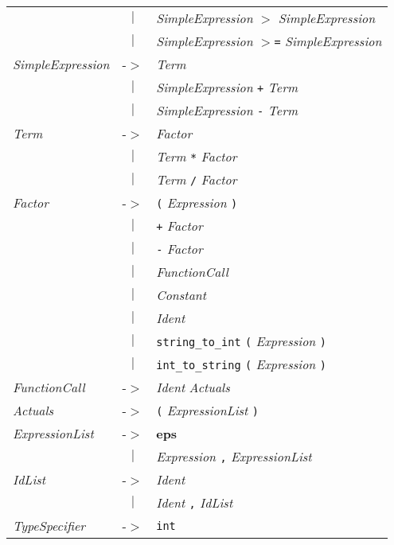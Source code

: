 \documentclass{article}
\begin{document}
\begin{center}
\begin{tabular}{lll}
 & \multicolumn{1}{c}{\textbf{$|$}} & \textit{SimpleExpression} \texttt{$>$} \textit{SimpleExpression} \\
 & \multicolumn{1}{c}{\textbf{$|$}} & \textit{SimpleExpression} \texttt{$>$=} \textit{SimpleExpression} \\
\textit{SimpleExpression} & -$>$ & \textit{Term} \\
 & \multicolumn{1}{c}{\textbf{$|$}} & \textit{SimpleExpression} \texttt{+} \textit{Term} \\
 & \multicolumn{1}{c}{\textbf{$|$}} & \textit{SimpleExpression} \texttt{-} \textit{Term} \\
\textit{Term} & -$>$ & \textit{Factor} \\
 & \multicolumn{1}{c}{\textbf{$|$}} & \textit{Term} \texttt{*} \textit{Factor} \\
 & \multicolumn{1}{c}{\textbf{$|$}} & \textit{Term} \texttt{/} \textit{Factor} \\
\textit{Factor} & -$>$ & \texttt{(} \textit{Expression} \texttt{)} \\
 & \multicolumn{1}{c}{\textbf{$|$}} & \texttt{+} \textit{Factor} \\
 & \multicolumn{1}{c}{\textbf{$|$}} & \texttt{-} \textit{Factor} \\
 & \multicolumn{1}{c}{\textbf{$|$}} & \textit{FunctionCall} \\
 & \multicolumn{1}{c}{\textbf{$|$}} & \textit{Constant} \\
 & \multicolumn{1}{c}{\textbf{$|$}} & \textit{Ident} \\
 & \multicolumn{1}{c}{\textbf{$|$}} & \texttt{string\_to\_int} \texttt{(} \textit{Expression} \texttt{)} \\
 & \multicolumn{1}{c}{\textbf{$|$}} & \texttt{int\_to\_string} \texttt{(} \textit{Expression} \texttt{)} \\
\textit{FunctionCall} & -$>$ & \textit{Ident} \textit{Actuals} \\
\textit{Actuals} & -$>$ & \texttt{(} \textit{ExpressionList} \texttt{)} \\
\textit{ExpressionList} & -$>$ & \textbf{eps} \\
 & \multicolumn{1}{c}{\textbf{$|$}} & \textit{Expression} \texttt{,} \textit{ExpressionList} \\
\textit{IdList} & -$>$ & \textit{Ident} \\
 & \multicolumn{1}{c}{\textbf{$|$}} & \textit{Ident} \texttt{,} \textit{IdList} \\
\textit{TypeSpecifier} & -$>$ & \texttt{int} \\

\end{tabular}
\end{center}
\end{document}
